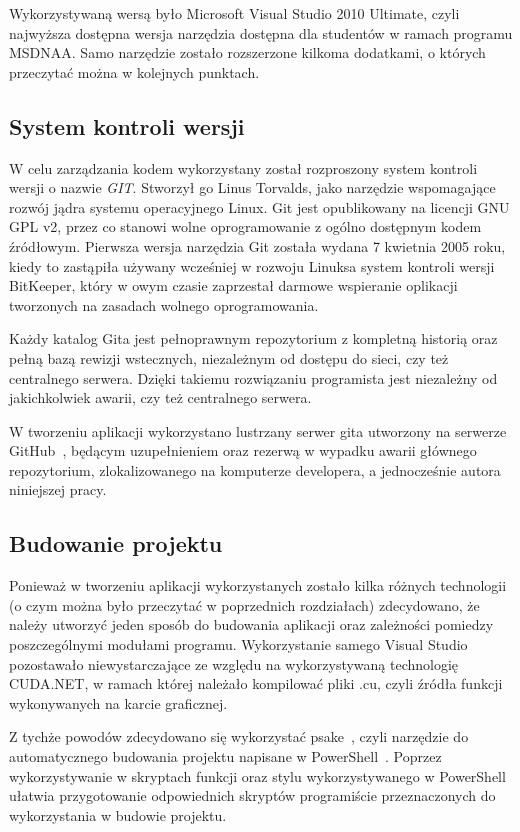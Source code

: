 Wykorzystywaną wersą było Microsoft Visual Studio 2010 Ultimate, czyli najwyższa dostępna wersja narzędzia dostępna dla studentów w ramach programu MSDNAA. Samo narzędzie zostało rozszerzone kilkoma dodatkami, o których przeczytać można w kolejnych punktach.

\subsection{System kontroli wersji}
W celu zarządzania kodem wykorzystany został rozproszony system kontroli wersji o nazwie \emph{GIT}. Stworzył go Linus Torvalds, jako narzędzie wspomagające rozwój jądra systemu operacyjnego Linux. Git jest opublikowany na licencji GNU GPL v2, przez co stanowi wolne oprogramowanie z ogólno dostępnym kodem źródłowym. Pierwsza wersja narzędzia Git została wydana 7 kwietnia 2005 roku, kiedy to zastąpiła używany wcześniej w rozwoju Linuksa system kontroli wersji BitKeeper, który w owym czasie zaprzestał darmowe wspieranie oplikacji tworzonych na zasadach wolnego oprogramowania.

Każdy katalog Gita jest pełnoprawnym repozytorium z kompletną historią oraz pełną bazą rewizji wstecznych, niezależnym od dostępu do sieci, czy też centralnego serwera. Dzięki takiemu rozwiązaniu programista jest niezależny od jakichkolwiek awarii, czy też centralnego serwera. 

W tworzeniu aplikacji wykorzystano lustrzany serwer gita utworzony na serwerze GitHub~\cite{cs:github}, będącym uzupełnieniem oraz rezerwą w wypadku awarii głównego repozytorium, zlokalizowanego na komputerze developera, a jednocześnie autora niniejszej pracy.

\subsection{Budowanie projektu}
Ponieważ w tworzeniu aplikacji wykorzystanych zostało kilka różnych technologii (o czym można było przeczytać w poprzednich rozdziałach) zdecydowano, że należy utworzyć jeden sposób do budowania aplikacji oraz zależności pomiedzy poszczególnymi modułami programu. Wykorzystanie samego Visual Studio pozostawało niewystarczające ze względu na wykorzystywaną technologię CUDA.NET, w ramach której należało kompilować pliki .cu, czyli źródła funkcji wykonywanych na karcie graficznej.

Z tychże powodów zdecydowano się wykorzystać psake~\cite{cs:psake}, czyli narzędzie do automatycznego budowania projektu napisane w PowerShell~\cite{ms:powershell}. Poprzez wykorzystywanie w skryptach funkcji oraz stylu wykorzystywanego w PowerShell ułatwia przygotowanie odpowiednich skryptów programiście przeznaczonych do wykorzystania w budowie projektu.

